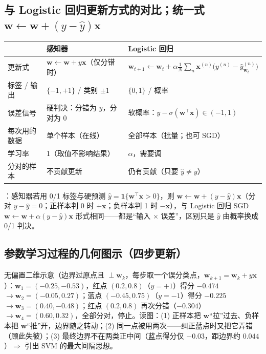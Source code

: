 \subsection{与 Logistic 回归更新方式的对比；统一式 \texorpdfstring{$\bm w\leftarrow\bm w+(y-\hat y)\bm x$}{w <- w + (y - yhat) x}}
\begin{center}\small
\begin{tabularx}{\linewidth}{@{}p{2.2cm}p{5.6cm}L@{}}
\toprule
 & 感知器 & Logistic 回归 \\
\midrule
更新式 & $\bm w\leftarrow\bm w+y\bm x$（仅分错时） & $\bm w_{t+1}\leftarrow\bm w_t+\alpha\frac1N\sum_n\bm x^{(n)}\big(y^{(n)}-\hat y^{(n)}_{\bm w_t}\big)$ \\
标签 / 输出 & $\{-1,+1\}$ / 类别 $\pm1$ & $\{0,1\}$ / 概率 \\
误差信号 & 硬判决：分错为 $y$，分对为 0 & 软概率：$y-\sigma(\bm w^\top\bm x)\in(-1,1)$ \\
每次用的数据 & 单个样本（在线） & 全部样本（批量；也可 SGD） \\
学习率 & 1（取值不影响结果） & $\alpha$，需要调 \\
分对的样本 & 不贡献更新 & 仍有贡献（只要 $\hat y\neq y$） \\
\bottomrule
\end{tabularx}
\end{center}
：感知器若用 0/1 标签与硬预测 $\hat y=\mathbf 1\{\bm w^\top\bm x>0\}$，则 $\bm w\leftarrow\bm w+(y-\hat y)\bm x$（分对 $y-\hat y=0$；正样本判 0 时 $+\bm x$；负样本判 1 时 $-\bm x$），与 Logistic 回归 SGD $\bm w\leftarrow\bm w+\alpha(y-\hat y)\bm x$ 形式相同——都是“输入 $\times$ 误差”，区别只是 $\hat y$ 由概率换成 0/1 判决。

\subsection{参数学习过程的几何图示（四步更新）}
无偏置二维示意（边界过原点且 $\perp\bm w_k$，每步取一个误分类点，$\bm w_{k+1}=\bm w_k+y\bm x$）：$\bm w_1=(-0.25,-0.53)$，红点 $(0.2,0.8)$（$y=+1$）得分 $-0.474$ $\to\bm w_2=(-0.05,0.27)$；蓝点 $(-0.45,0.75)$（$y=-1$）得分 $-0.225$ $\to\bm w_3=(0.40,-0.48)$；红点 $(0.2,0.8)$ 再次分错（$-0.304$）$\to\bm w_4=(0.60,0.32)$，全部分对，停止。读图：(1) 正样本把 $\bm w$“拉”过去、负样本把 $\bm w$“推”开，边界随之转动；(2) 同一点被用两次——纠正蓝点时又把它弄错（顾此失彼）；(3) 最终边界不在两类正中间（蓝点得分仅 $-0.03$，距边界约 $0.044$）$\Rightarrow$ 引出 SVM 的最大间隔思想。

